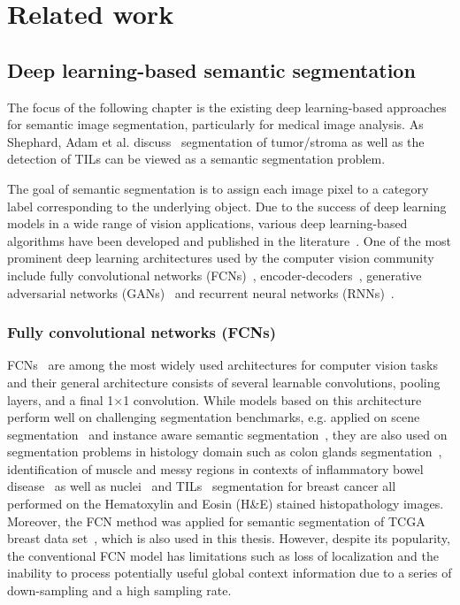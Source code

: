 \chapter{Related work}
\section{Deep learning-based semantic segmentation}
The focus of the following chapter is the existing deep learning-based approaches for semantic image segmentation, particularly for medical image analysis. As Shephard, Adam et al. discuss~\cite{shephard2022tiager} segmentation of tumor/stroma as well as the detection of TILs can be viewed as a semantic segmentation problem. 

The goal of semantic segmentation is to assign each image pixel to a category label corresponding to the underlying object. Due to the success of deep learning models in a wide range of vision applications, various deep learning-based algorithms have been developed and published in the literature~\cite{minaee2021image}. One of the most prominent deep learning architectures used by the computer vision community include fully convolutional networks (FCNs)~\cite{long2015fully}, encoder-decoders~\cite{noh2015learning}, generative adversarial networks (GANs)~\cite{goodfellow2014generative} and recurrent neural networks (RNNs)~\cite{rumelhart1986learning}.

\subsection{Fully convolutional networks (FCNs)}
FCNs~\cite{long2015fully} are among the most widely used architectures for computer vision tasks and their general architecture consists of several learnable convolutions, pooling layers, and a final 1$\times$1 convolution. While models based on this architecture perform well on challenging segmentation benchmarks, e.g. applied on scene segmentation~\cite{yu2020context} and instance aware semantic segmentation~\cite{li2017fully}, they are also used on segmentation problems in histology domain such as colon glands segmentation~\cite{bentaieb2016topology}, identification of muscle and messy regions in contexts of inflammatory bowel disease~\cite{wang2016deep} as well as nuclei~\cite{natarajan2020segmentation} and TILs~\cite{amgad2019joint} segmentation for breast cancer all performed on the Hematoxylin and Eosin (H\&E) stained histopathology images. Moreover, the FCN method was applied for semantic segmentation of TCGA~\cite{gutman2013cancer} breast data set~\cite{amgad2019structured}, which is also used in this thesis. However, despite its popularity, the conventional FCN model has limitations such as loss of localization and the inability to process potentially useful global context information due to a series of down-sampling and a high sampling rate.

